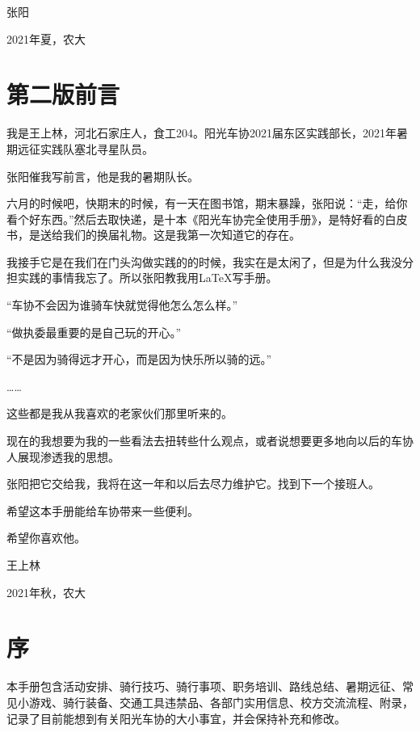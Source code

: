 \documentclass{ctexbook}
\begin{document}
\hfill 张\hspace{3mm}阳 \hspace{10mm}

\hfill 2021年夏，农大\hspace{2mm}


\chapter{第二版前言}
我是王上林，河北石家庄人，食工204。阳光车协2021届东区实践部长，2021年暑期远征实践队塞北寻星队员。

张阳催我写前言，他是我的暑期队长。

六月的时候吧，快期末的时候，有一天在图书馆，期末暴躁，张阳说：“走，给你看个好东西。”然后去取快递，是十本《阳光车协完全使用手册》，是特好看的白皮书，是送给我们的换届礼物。这是我第一次知道它的存在。

我接手它是在我们在门头沟做实践的的时候，我实在是太闲了，但是为什么我没分担实践的事情我忘了。所以张阳教我用\LaTeX 写手册。

“车协不会因为谁骑车快就觉得他怎么怎么样。”

“做执委最重要的是自己玩的开心。”

“不是因为骑得远才开心，而是因为快乐所以骑的远。”

……

这些都是我从我喜欢的老家伙们那里听来的。

现在的我想要为我的一些看法去扭转些什么观点，或者说想要更多地向以后的车协人展现渗透我的思想。

张阳把它交给我，我将在这一年和以后去尽力维护它。找到下一个接班人。

希望这本手册能给车协带来一些便利。

希望你喜欢他。

\hfill 王\hspace{3mm}上\hspace{3mm}林 \hspace{10mm}

\hfill 2021年秋，农大\hspace{2mm}

\chapter{序}
本手册包含活动安排、骑行技巧、骑行事项、职务培训、路线总结、暑期远征、常见小游戏、骑行装备、交通工具违禁品、各部门实用信息、校方交流流程、附录，记录了目前能想到有关阳光车协的大小事宜，并会保持补充和修改。
\end{document}
